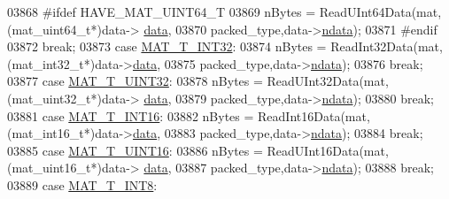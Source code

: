 \begin{DoxyCode}
{{{{{{{{{{{{{{{{{{{03868 \textcolor{preprocessor}{#ifdef HAVE\_MAT\_UINT64\_T}
03869                             nBytes = ReadUInt64Data(mat,(mat\_uint64\_t*)data->
      \hyperlink{group___m_a_t_ae2c648cb9eac4ce47f26cddb44246152}{data},
03870                                 packed\_type,data->\hyperlink{group___m_a_t_a1beb8a8c58a808207cbea650563a9b63}{ndata});
03871 \textcolor{preprocessor}{#endif}
03872                             \textcolor{keywordflow}{break};
03873                         \textcolor{keywordflow}{case} \hyperlink{group___m_a_t_ggacf7b3b879282b7ab3a51190e49bf3453a83e06a68320726c6572bfbb9f3addb1d}{MAT\_T\_INT32}:
03874                             nBytes = ReadInt32Data(mat,(mat\_int32\_t*)data->\hyperlink{group___m_a_t_ae2c648cb9eac4ce47f26cddb44246152}{data},
03875                                 packed\_type,data->\hyperlink{group___m_a_t_a1beb8a8c58a808207cbea650563a9b63}{ndata});
03876                             \textcolor{keywordflow}{break};
03877                         \textcolor{keywordflow}{case} \hyperlink{group___m_a_t_ggacf7b3b879282b7ab3a51190e49bf3453aa397e285a23fe240368b752897652c6a}{MAT\_T\_UINT32}:
03878                             nBytes = ReadUInt32Data(mat,(mat\_uint32\_t*)data->
      \hyperlink{group___m_a_t_ae2c648cb9eac4ce47f26cddb44246152}{data},
03879                                 packed\_type,data->\hyperlink{group___m_a_t_a1beb8a8c58a808207cbea650563a9b63}{ndata});
03880                             \textcolor{keywordflow}{break};
03881                         \textcolor{keywordflow}{case} \hyperlink{group___m_a_t_ggacf7b3b879282b7ab3a51190e49bf3453a8c5b2e381946e95ea8d81ac216743302}{MAT\_T\_INT16}:
03882                             nBytes = ReadInt16Data(mat,(mat\_int16\_t*)data->\hyperlink{group___m_a_t_ae2c648cb9eac4ce47f26cddb44246152}{data},
03883                                 packed\_type,data->\hyperlink{group___m_a_t_a1beb8a8c58a808207cbea650563a9b63}{ndata});
03884                             \textcolor{keywordflow}{break};
03885                         \textcolor{keywordflow}{case} \hyperlink{group___m_a_t_ggacf7b3b879282b7ab3a51190e49bf3453a05bc7af7680aa68be95126ae0a4c2e31}{MAT\_T\_UINT16}:
03886                             nBytes = ReadUInt16Data(mat,(mat\_uint16\_t*)data->
      \hyperlink{group___m_a_t_ae2c648cb9eac4ce47f26cddb44246152}{data},
03887                                 packed\_type,data->\hyperlink{group___m_a_t_a1beb8a8c58a808207cbea650563a9b63}{ndata});
03888                             \textcolor{keywordflow}{break};
03889                         \textcolor{keywordflow}{case} \hyperlink{group___m_a_t_ggacf7b3b879282b7ab3a51190e49bf3453a9807f5033ed4f9b548953742d9fd1658}{MAT\_T\_INT8}:
}}}}}}}}}}}}}}}}}}}
\end{DoxyCode}
